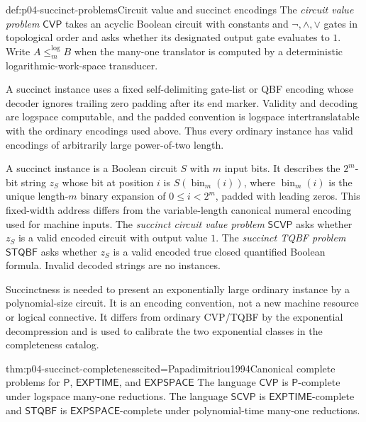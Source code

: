 \begin{hbdefinition}{def:p04-succinct-problems}{Circuit value and succinct encodings}
The \emph{circuit value problem} \(\mathsf{CVP}\) takes an acyclic Boolean
circuit with constants and \(\neg,\land,\lor\) gates in topological order and
asks whether its designated output gate evaluates to \(1\).  Write
\(A\leq_m^{\log}B\) when the many-one translator is computed by a deterministic
logarithmic-work-space transducer.

A succinct instance uses a fixed self-delimiting gate-list or QBF encoding
whose decoder ignores trailing zero padding after its end marker.  Validity and
decoding are logspace computable, and the padded convention is logspace
intertranslatable with the ordinary encodings used above.  Thus every ordinary
instance has valid encodings of arbitrarily large power-of-two length.

A succinct instance is a Boolean circuit \(S\) with \(m\) input bits.  It
describes the \(2^m\)-bit string \(z_S\) whose bit at position \(i\) is
\(S(\operatorname{bin}_m(i))\), where \(\operatorname{bin}_m(i)\) is the
unique length-\(m\) binary expansion of \(0\leq i<2^m\), padded with leading
zeros.  This fixed-width address differs from the variable-length canonical
numeral encoding used for machine inputs.  The \emph{succinct circuit value problem}
\(\mathsf{SCVP}\) asks whether \(z_S\) is a valid encoded circuit with output
value \(1\).  The \emph{succinct TQBF problem} \(\mathsf{STQBF}\) asks whether
\(z_S\) is a valid encoded true closed quantified Boolean formula.  Invalid
decoded strings are no instances.

Succinctness is needed to present an exponentially large ordinary instance by
a polynomial-size circuit.  It is an encoding convention, not a new machine
resource or logical connective.  It differs from ordinary CVP/TQBF by the
exponential decompression and is used to calibrate the two exponential classes
in the completeness catalog.
\end{hbdefinition}

\begin{hbtheorem}{thm:p04-succinct-completeness}{cited=Papadimitriou1994}{Canonical complete problems for \(\mathsf P\), \(\mathsf{EXPTIME}\), and \(\mathsf{EXPSPACE}\)}
The language \(\mathsf{CVP}\) is \(\mathsf P\)-complete under
logspace many-one reductions.  The language \(\mathsf{SCVP}\) is
\(\mathsf{EXPTIME}\)-complete and \(\mathsf{STQBF}\) is
\(\mathsf{EXPSPACE}\)-complete under polynomial-time many-one reductions.
\end{hbtheorem}

